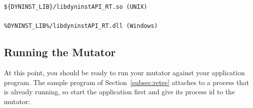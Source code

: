 \begin{lstlisting}[language={}]
${DYNINST_LIB}/libdyninstAPI_RT.so (UNIX)

%DYNINST_LIB%/libdyninstAPI_RT.dll (Windows)
\end{lstlisting}

\subsection{Running the Mutator}

At this point, you should be ready to run your mutator against your
application program. The sample program of Section~\ref{subsec:retee} attaches
to a process that is already running, so start the application first and give
its process id to the mutator:

